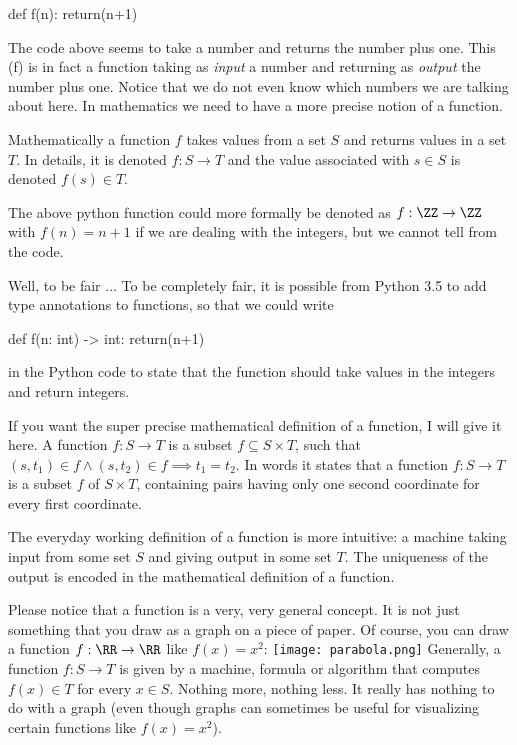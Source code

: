\documentclass{article}
\begin{document}
\begin{code}
def f(n): return(n+1) 
\end{code}

The code above seems to take a number and returns the number plus one. This (f) is in fact a function 
taking as \emph{input} a number and returning as \emph{output} the number plus one. Notice that
we do not even know which numbers we are talking about here. In mathematics we need to have
a more precise notion of a function. 


Mathematically a function $f$ takes values from a set $S$ and returns values in a set $T$. In details,
it is denoted $f: S\rightarrow T$ and the value associated with $s\in S$ is denoted $f(s)\in T$.

The above python function could more formally be denoted as $f: \ZZ\rightarrow \ZZ$ with
$f(n) = n+1$ if we are dealing with the integers, but we cannot tell from the code.

\begin{hideinbutton}{Well, to be fair ...}
To be completely fair, it is possible from Python 3.5 to add type annotations to functions, so that we could write
\begin{code}
def f(n: int) -> int: return(n+1)
\end{code}
in the Python code to state that the function should take values in the integers and return integers.
\end{hideinbutton}


If you want the  super precise mathematical definition of a function, I
will give it here.  A function $f: S\rightarrow T$ is a subset
$f\subseteq S\times T$, such that
$(s, t_1)\in f \land (s, t_2)\in f \implies t_1 = t_2$. In words it states that a
function $f: S\rightarrow T$ is a subset $f$ of $S\times T$, containing pairs
having only one second coordinate for every first coordinate.

The everyday working definition of a
function is more intuitive: a machine taking input from some set
$S$ and giving output in some set $T$. The uniqueness of the output
is encoded in the mathematical definition of a function.


\begin{remark}[emph]\label{graphremark}
  Please notice that a function is a very, very general concept. It is not just something
  that you draw as a graph on a piece of paper. Of course, you can draw a function
  $f:\RR\rightarrow \RR$ like $f(x) = x^2$:
  \texttt{[image: parabola.png]}
  Generally, a function $f: S\rightarrow T$ is given by a machine, formula or algorithm that
  computes $f(x)\in T$ for every $x\in S$. Nothing more, nothing less. It really has nothing to
  do with a graph (even though graphs can sometimes be useful for visualizing certain functions like $f(x) = x^2$).
\end{remark}
\end{document}
